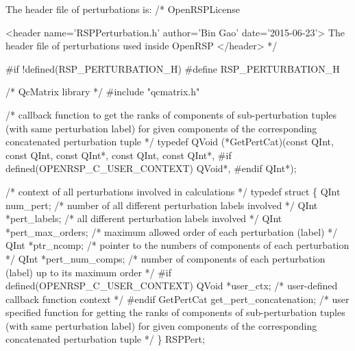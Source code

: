 The header file of perturbations is:
\nwenddocs{}\endmoddef
/*
  \LA{}OpenRSPLicense~{\nwtagstyle{}}\RA{}

  <header name='RSPPerturbation.h' author='Bin Gao' date='2015-06-23'>
    The header file of perturbations used inside OpenRSP
  </header>
*/

#if !defined(RSP_PERTURBATION_H)
#define RSP_PERTURBATION_H

/* QcMatrix library */
#include "qcmatrix.h"

/* callback function to get the ranks of components of sub-perturbation
   tuples (with same perturbation label) for given components of the
   corresponding concatenated perturbation tuple */
typedef QVoid (*GetPertCat)(const QInt,
                            const QInt,
                            const QInt*,
                            const QInt,
                            const QInt*,
#if defined(OPENRSP_C_USER_CONTEXT)
                            QVoid*,
#endif
                            QInt*);

/* context of all perturbations involved in calculations */
typedef struct \{
    QInt num_pert;                      /* number of all different perturbation labels involved */
    QInt *pert_labels;                  /* all different perturbation labels involved */
    QInt *pert_max_orders;              /* maximum allowed order of each perturbation (label) */
    QInt *ptr_ncomp;                    /* pointer to the numbers of components of each perturbation */
    QInt *pert_num_comps;               /* number of components of each perturbation (label) up to
                                           its maximum order */
#if defined(OPENRSP_C_USER_CONTEXT)     
    QVoid *user_ctx;                    /* user-defined callback function context */
#endif
    GetPertCat get_pert_concatenation;  /* user specified function for getting the ranks of
                                           components of sub-perturbation tuples (with same
                                           perturbation label) for given components of the
                                           corresponding concatenated perturbation tuple */
\} RSPPert;

